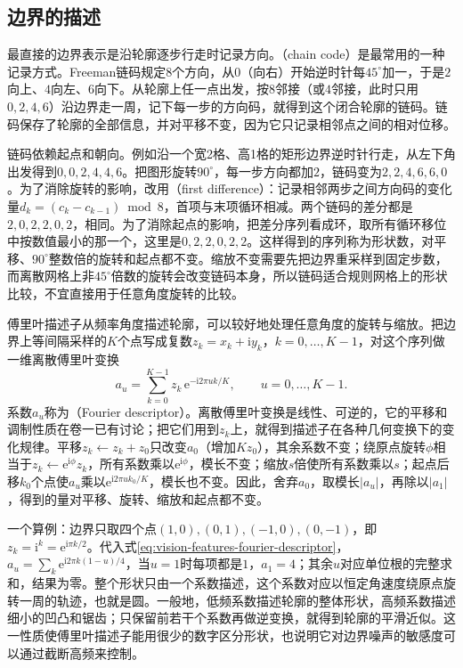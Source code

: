 \subsection{边界的描述}
\label{sec:vision-features-boundary}

最直接的边界表示是沿轮廓逐步行走时记录方向。（chain code）是最常用的一种记录方式。Freeman链码规定8个方向，从$0$（向右）开始逆时针每$45^\circ$加一，于是$2$向上、$4$向左、$6$向下。从轮廓上任一点出发，按$8$邻接（或$4$邻接，此时只用$0,2,4,6$）沿边界走一周，记下每一步的方向码，就得到这个闭合轮廓的链码。链码保存了轮廓的全部信息，并对平移不变，因为它只记录相邻点之间的相对位移。

链码依赖起点和朝向。例如沿一个宽2格、高1格的矩形边界逆时针行走，从左下角出发得到$0,0,2,4,4,6$。把图形旋转$90^\circ$，每一步方向都加$2$，链码变为$2,2,4,6,6,0$。为了消除旋转的影响，改用（first difference）：记录相邻两步之间方向码的变化量$d_k=(c_k-c_{k-1})\bmod8$，首项与末项循环相减。两个链码的差分都是$2,0,2,2,0,2$，相同。为了消除起点的影响，把差分序列看成环，取所有循环移位中按数值最小的那一个，这里是$0,2,2,0,2,2$。这样得到的序列称为形状数，对平移、$90^\circ$整数倍的旋转和起点都不变。缩放不变需要先把边界重采样到固定步数，而离散网格上非$45^\circ$倍数的旋转会改变链码本身，所以链码适合规则网格上的形状比较，不宜直接用于任意角度旋转的比较。

傅里叶描述子从频率角度描述轮廓，可以较好地处理任意角度的旋转与缩放。把边界上等间隔采样的$K$个点写成复数$z_k=x_k+\mathrm iy_k$，$k=0,\ldots,K-1$，对这个序列做一维离散傅里叶变换
\begin{equation}
  a_u=\sum_{k=0}^{K-1}z_k\,\mathrm e^{-\mathrm i2\pi uk/K},\qquad u=0,\ldots,K-1.
  \label{eq:vision-features-fourier-descriptor}
\end{equation}
系数$a_u$称为（Fourier descriptor）。离散傅里叶变换是线性、可逆的，它的平移和调制性质在卷一已有讨论；把它们用到$z_k$上，就得到描述子在各种几何变换下的变化规律。平移$z_k\gets z_k+z_0$只改变$a_0$（增加$Kz_0$），其余系数不变；绕原点旋转$\phi$相当于$z_k\gets\mathrm e^{\mathrm i\phi}z_k$，所有系数乘以$\mathrm e^{\mathrm i\phi}$，模长不变；缩放$s$倍使所有系数乘以$s$；起点后移$k_0$个点使$a_u$乘以$\mathrm e^{\mathrm i2\pi uk_0/K}$，模长也不变。因此，舍弃$a_0$，取模长$\lvert a_u\rvert$，再除以$\lvert a_1\rvert$，得到的量对平移、旋转、缩放和起点都不变。

一个算例：边界只取四个点$(1,0),(0,1),(-1,0),(0,-1)$，即$z_k=\mathrm i^k=\mathrm e^{\mathrm i\pi k/2}$。代入式\eqref{eq:vision-features-fourier-descriptor}，$a_u=\sum_k\mathrm e^{\mathrm i2\pi k(1-u)/4}$，当$u=1$时每项都是$1$，$a_1=4$；其余$u$对应单位根的完整求和，结果为零。整个形状只由一个系数描述，这个系数对应以恒定角速度绕原点旋转一周的轨迹，也就是圆。一般地，低频系数描述轮廓的整体形状，高频系数描述细小的凹凸和锯齿；只保留前若干个系数再做逆变换，就得到轮廓的平滑近似。这一性质使傅里叶描述子能用很少的数字区分形状，也说明它对边界噪声的敏感度可以通过截断高频来控制。

